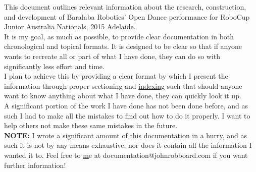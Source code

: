 This document outlines relevant information about the research, construction, and development of Baralaba Robotics' Open Dance performance for RoboCup Junior Australia Nationals, 2015 Adelaide.\\
        
It is my goal, as much as possible, to provide clear documentation in both chronological and topical formats. It is designed to be clear so that if anyone wants to recreate all or part of what I have done, they can do so with significantly less effort and time.\\
	
I plan to achieve this by providing a clear format by which I present the information through proper sectioning and \hyperref[index]{indexing} such that should anyone want to know anything about what I have done, they can quickly look it up.\\

A significant portion of the work I have done has not been done before, and as such I had to make all the mistakes to find out how to do it properly. I want to help others not make these same mistakes in the future.\\

\textbf{NOTE:} I wrote a significant amount of this documentation in a hurry, and as such it is not by any means exhaustive, nor does it contain all the information I wanted it to. Feel free to \hyperref[contact] me at documentation@johnrobboard.com if you want further information!